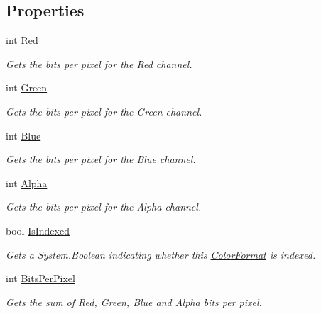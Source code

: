 \subsection*{Properties}
\begin{DoxyCompactItemize}
\item 
int \hyperlink{struct_open_t_k_1_1_graphics_1_1_color_format_a22906f49d73faf746e644ff2adfd06ae}{Red}
\begin{DoxyCompactList}\small\item\em Gets the bits per pixel for the Red channel.\end{DoxyCompactList}\item 
int \hyperlink{struct_open_t_k_1_1_graphics_1_1_color_format_a0f17008f6787a52dd9de950bb23919e1}{Green}
\begin{DoxyCompactList}\small\item\em Gets the bits per pixel for the Green channel.\end{DoxyCompactList}\item 
int \hyperlink{struct_open_t_k_1_1_graphics_1_1_color_format_add160b210eeea02a6d3f476b87685fc5}{Blue}
\begin{DoxyCompactList}\small\item\em Gets the bits per pixel for the Blue channel.\end{DoxyCompactList}\item 
int \hyperlink{struct_open_t_k_1_1_graphics_1_1_color_format_a62139f7562786b8d8e4c1bc44d6f4ecc}{Alpha}
\begin{DoxyCompactList}\small\item\em Gets the bits per pixel for the Alpha channel.\end{DoxyCompactList}\item 
bool \hyperlink{struct_open_t_k_1_1_graphics_1_1_color_format_ad637b57bedf797f4996b698adb0e5383}{Is\-Indexed}
\begin{DoxyCompactList}\small\item\em Gets a System.\-Boolean indicating whether this \hyperlink{struct_open_t_k_1_1_graphics_1_1_color_format}{Color\-Format} is indexed.\end{DoxyCompactList}\item 
int \hyperlink{struct_open_t_k_1_1_graphics_1_1_color_format_a0e7b8a35d1e3504751ffcd000ec3e2ff}{Bits\-Per\-Pixel}
\begin{DoxyCompactList}\small\item\em Gets the sum of Red, Green, Blue and Alpha bits per pixel.\end{DoxyCompactList}\end{DoxyCompactItemize}


